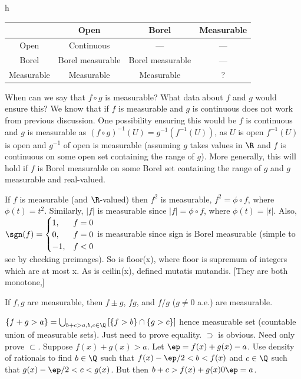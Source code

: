 	\begin{table}{h}
	\begin{tabular}{|c|c|c|c|} \hline
	\diagbox{is}{(*)} & Open & Borel & Measurable \\ \hline
	Open & Continuous & --- & --- \\ \hline
	Borel & Borel measurable & Borel measurable & --- \\ \hline
	Measurable & Measurable & Measurable & ? \\ \hline
	\end{tabular}
	\end{table}



When can we say that $f \circ g$ is measurable? What data about $f$ and $g$ would ensure this? 
We know that if $f$ is measurable and $g$ is continuous does not work from previous discussion. One possibility ensuring this would be $f$ is continuous and $g$ is measurable as $(f \circ g)^{-1}(U)= g^{-1}(f^{-1}(U))$, as $U$ is open $f^{-1}(U)$ is open and $g^{-1}$ of open is measurable (assuming $g$ takes values in $\R$ and $f$ is continuous on some open set containing the range of $g$). More generally, this will hold if $f$ is Borel measurable on some Borel set containing the range of $g$ and $g$ measurable and real-valued. 


\begin{ex}
If $f$ is measurable (and $\R$-valued) then $f^2$ is measurable, $f^2= \phi \circ f$, where $\phi(t)=t^2$. Similarly, $|f|$ is measurable since $|f|= \phi \circ f$, where $\phi(t)=|t|$. Also, $\sgn(f) = \begin{cases} 1, & f=0 \\ 0, & f=0 \\ -1, & f<0 \end{cases}$ is measurable since sign is Borel measurable (simple to see by checking preimages). So is floor(x), where floor is supremum of integers which are at most x. As is ceilin(x), defined mutatis mutandis. [They are both monotone,]

\end{ex}


\begin{thm}
If $f,g$ are measurable, then $f \pm g$, $fg$, and $f/g$ ($g \neq 0$ a.e.) are measurable.
\end{thm}

\pf $\{f+g>a\}= \bigcup_{b+c>a, b,c \in \Q} \left[ \{f>b\} \cap \{g>c\} \right]$ hence measurable set (countable union of measurable sets). Just need to prove equality. $\supset$ is obvious. Need only prove $\subset$. Suppose $f(x)+g(x)>a$. Let $\ep= f(x)+g(x)-a$. Use density of rationals to find $b \in \Q$ such that $f(x)- \ep/2<b<f(x)$ and $c \in \Q$ such that $g(x) - \ep/2<c<g(x)$. But then $b+c>f(x)+g(x)0\ep=a$. 


